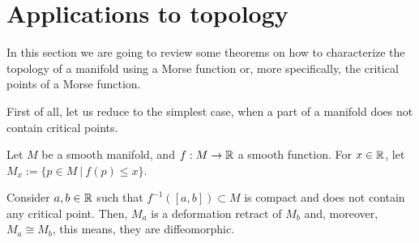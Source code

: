 \section{Applications to topology} \label{section:morse_topology}

In this section we are going to review some theorems on how to characterize the topology of a manifold using a Morse function or, more specifically, the critical points of a Morse function.

First of all, let us reduce to the simplest case, when a part of a manifold does not contain critical points.

Let $M$ be a smooth manifold, and $f : M \rightarrow \mathbb{R}$ a smooth function. For $x \in \mathbb{R}$, let $M_x := \{p \in M \ | \ f(p) \leq x\}$.

\begin{prop} \label{nocriticalpoints}
Consider $a, b \in \mathbb{R}$ such that $f^{-1}([a,b]) \subset M$ is compact and does not contain any critical point. Then, $M_a$ is a deformation retract of $M_b$ and, moreover, $M_a \cong M_b$, this means, they are diffeomorphic.
\end{prop}

